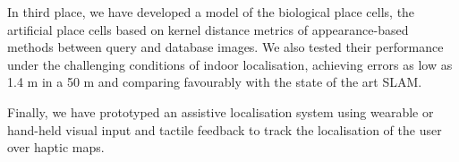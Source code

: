 In third place, we have developed a model of the biological place cells, the artificial place cells based on kernel distance metrics of appearance-based methods between query and database images. We also tested their performance under the challenging conditions of indoor localisation, achieving errors as low as 1.4 m in a 50 m and comparing favourably with the state of the art SLAM. 

Finally, we have prototyped an assistive localisation system using wearable or hand-held visual input and tactile feedback to track the localisation of the user over haptic maps.


\vfill



\endgroup			

\vfill